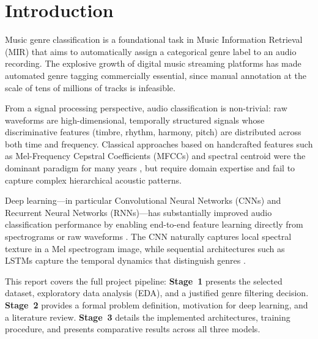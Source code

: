 \documentclass[12pt, a4paper]{article}
\begin{document}
\setlength{\parskip}{0pt}
\tableofcontents
\setlength{\parskip}{6pt}
\thispagestyle{empty}
\newpage

\setcounter{page}{1}

\section{Introduction}
\label{sec:intro}

Music genre classification is a foundational task in Music Information Retrieval (MIR) that aims to automatically assign a categorical genre label to an audio recording. The explosive growth of digital music streaming platforms has made automated genre tagging commercially essential, since manual annotation at the scale of tens of millions of tracks is infeasible.

From a signal processing perspective, audio classification is non-trivial: raw waveforms
are high-dimensional, temporally structured signals whose discriminative features
(timbre, rhythm, harmony, pitch) are distributed across both time and frequency.
Classical approaches based on handcrafted features such as Mel-Frequency Cepstral
Coefficients (MFCCs) and spectral centroid were the dominant paradigm for many years
\citep{tzanetakis2002musical}, but require domain expertise and fail to capture complex
hierarchical acoustic patterns.

Deep learning---in particular Convolutional Neural Networks (CNNs) and Recurrent Neural
Networks (RNNs)---has substantially improved audio classification performance by enabling
end-to-end feature learning directly from spectrograms or raw waveforms
\citep{choi2017convolutional}. The CNN naturally captures local spectral texture in a
Mel spectrogram image, while sequential architectures such as LSTMs capture the temporal
dynamics that distinguish genres \citep{choi2017crnn}.

This report covers the full project pipeline: \textbf{Stage~1} presents the selected
dataset, exploratory data analysis (EDA), and a justified genre filtering decision.
\textbf{Stage~2} provides a formal problem definition, motivation for deep learning, and
a literature review. \textbf{Stage~3} details the implemented architectures, training
procedure, and presents comparative results across all three models.
\end{document}

